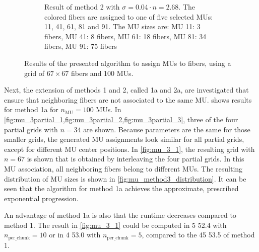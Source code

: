 \begin{figure}
\begin{subfigure}[t]{0.48\textwidth}
    \caption{Result of method 2 with $\sigma = 0.04\cdot n = \num{2.68}$. The colored fibers are assigned to one of five selected MUs: 11, 41, 61, 81 and 91. The MU sizes are:  
    MU 11: 3 fibers, MU 41: 8 fibers, MU 61: 18 fibers, MU 81: 34 fibers, MU 91: 75 fibers}%
    \label{fig:MU_fibre_distribution_sparse2_67x67_100_2d_fiber_distribution}%
  \end{subfigure}
  \caption{Results of the presented algorithm to assign MUs to fibers, using a grid of $67 \times 67$ fibers and 100 MUs.}%
  \label{fig:100mus_results}%
\end{figure}%




Next, the extension of methods 1 and 2, called 1a and 2a, are investigated that ensure that neighboring fibers are not associated to the same MU.
 shows results for method 1a for $n_\text{MU}=100$ MUs. In \cref{fig:mu_3partial_1,fig:mu_3partial_2,fig:mu_3partial_3}, three of the four partial grids with $n=34$ are shown. 
Because parameters are the same for those smaller grids, the generated MU assignments look similar for all partial grids, except for different MU center positions. In \cref{fig:mu_3_1}, the resulting grid with $n=67$ is shown that is obtained by interleaving the four partial grids. In this MU association, all neighboring fibers belong to different MUs. The resulting distribution of MU sizes is shown in \cref{fig:mu_method3_distribution}. It can be seen that the algorithm for method 1a achieves the approximate, prescribed exponential progression.

An advantage of method 1a is also that the runtime decreases compared to method 1. The result in \cref{fig:mu_3_1} could be computed in \SI{5}{\min} \SI{52.4}{\sec} with $n_\text{per\_chunk}=10$ or in \SI{4}{\min} \SI{53.0}{\sec} with $n_\text{per\_chunk}=5$, compared to the \SI{45}{\min} \SI{53.5}{\sec} of method 1.

